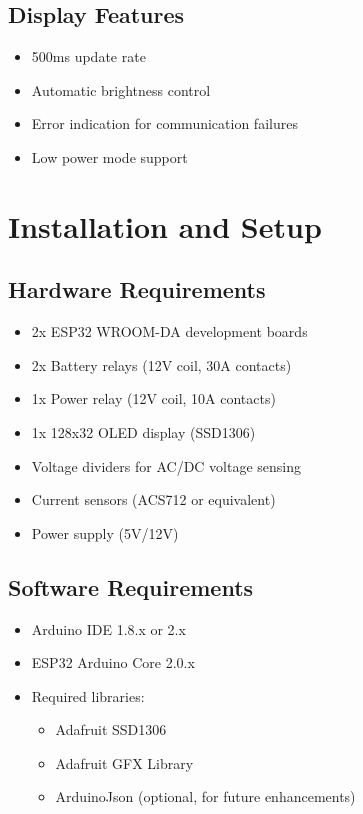 \documentclass[11pt,a4paper]{article}
\begin{document}
\subsection{Display Features}
\begin{itemize}
    \item 500ms update rate
    \item Automatic brightness control
    \item Error indication for communication failures
    \item Low power mode support
\end{itemize}

\section{Installation and Setup}

\subsection{Hardware Requirements}
\begin{itemize}
    \item 2x ESP32 WROOM-DA development boards
    \item 2x Battery relays (12V coil, 30A contacts)
    \item 1x Power relay (12V coil, 10A contacts)
    \item 1x 128x32 OLED display (SSD1306)
    \item Voltage dividers for AC/DC voltage sensing
    \item Current sensors (ACS712 or equivalent)
    \item Power supply (5V/12V)
\end{itemize}

\subsection{Software Requirements}
\begin{itemize}
    \item Arduino IDE 1.8.x or 2.x
    \item ESP32 Arduino Core 2.0.x
    \item Required libraries:
    \begin{itemize}
        \item Adafruit SSD1306
        \item Adafruit GFX Library
        \item ArduinoJson (optional, for future enhancements)
    \end{itemize}
\end{itemize}
\end{document}
